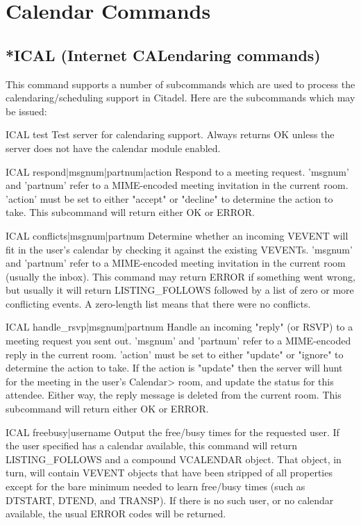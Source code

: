 \section{Calendar Commands}

\subsection{*ICAL (Internet CALendaring commands)}

 This command supports a number of subcommands which are used to process the
calendaring/scheduling support in Citadel.  Here are the subcommands which
may be issued:

 ICAL test
  Test server for calendaring support.  Always returns OK unless the server
  does not have the calendar module enabled.

 ICAL respond|msgnum|partnum|action
  Respond to a meeting request.  'msgnum' and 'partnum' refer to a MIME-encoded
  meeting invitation in the current room.  'action' must be set to either
  "accept" or "decline" to determine the action to take.  This subcommand will
  return either OK or ERROR.

 ICAL conflicts|msgnum|partnum
  Determine whether an incoming VEVENT will fit in the user's calendar by
  checking it against the existing VEVENTs.  'msgnum' and 'partnum' refer to
  a MIME-encoded meeting invitation in the current room (usually the inbox).
  This command may return ERROR if something went wrong, but usually it will
  return LISTING_FOLLOWS followed by a list of zero or more conflicting
  events.  A zero-length list means that there were no conflicts.

 ICAL handle_rsvp|msgnum|partnum
  Handle an incoming "reply" (or RSVP) to a meeting request you sent out.
  'msgnum' and 'partnum' refer to a MIME-encoded reply in the current room.
  'action' must be set to either "update" or "ignore" to determine the action
  to take.  If the action is "update" then the server will hunt for the meeting
  in the user's Calendar> room, and update the status for this attendee.  Either
  way, the reply message is deleted from the current room.  This subcommand will
  return either OK or ERROR.

 ICAL freebusy|username
  Output the free/busy times for the requested user.  If the user specified
  has a calendar available, this command will return LISTING_FOLLOWS and a
  compound VCALENDAR object.  That object, in turn, will contain VEVENT
  objects that have been stripped of all properties except for the bare
  minimum needed to learn free/busy times (such as DTSTART, DTEND, and
  TRANSP).  If there is no such user, or no calendar available, the usual
  ERROR codes will be returned.

